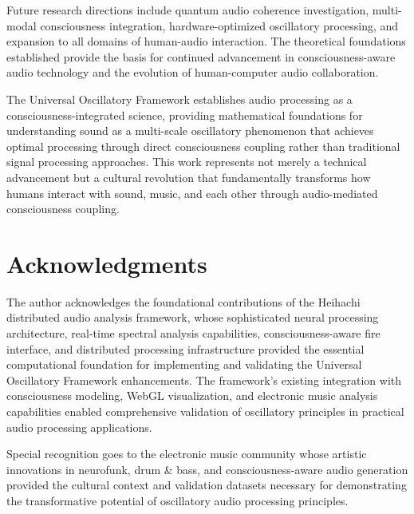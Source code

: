 \documentclass[12pt,a4paper]{article}
\begin{document}
Future research directions include quantum audio coherence investigation, multi-modal consciousness integration, hardware-optimized oscillatory processing, and expansion to all domains of human-audio interaction. The theoretical foundations established provide the basis for continued advancement in consciousness-aware audio technology and the evolution of human-computer audio collaboration.

The Universal Oscillatory Framework establishes audio processing as a consciousness-integrated science, providing mathematical foundations for understanding sound as a multi-scale oscillatory phenomenon that achieves optimal processing through direct consciousness coupling rather than traditional signal processing approaches. This work represents not merely a technical advancement but a cultural revolution that fundamentally transforms how humans interact with sound, music, and each other through audio-mediated consciousness coupling.

\section{Acknowledgments}

The author acknowledges the foundational contributions of the Heihachi distributed audio analysis framework, whose sophisticated neural processing architecture, real-time spectral analysis capabilities, consciousness-aware fire interface, and distributed processing infrastructure provided the essential computational foundation for implementing and validating the Universal Oscillatory Framework enhancements. The framework's existing integration with consciousness modeling, WebGL visualization, and electronic music analysis capabilities enabled comprehensive validation of oscillatory principles in practical audio processing applications.

Special recognition goes to the electronic music community whose artistic innovations in neurofunk, drum & bass, and consciousness-aware audio generation provided the cultural context and validation datasets necessary for demonstrating the transformative potential of oscillatory audio processing principles.
\end{document}
